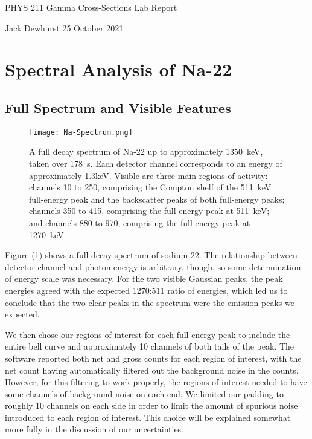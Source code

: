 \documentclass[letter]{article}
\begin{document}

\begin{center}
	{\large PHYS 211 Gamma Cross-Sections Lab Report}
	
	Jack Dewhurst \hspace{1cm}
	25 October 2021
	
	\vspace{5mm}
\end{center}
	


\section{Spectral Analysis of Na-22}

\subsection{Full Spectrum and Visible Features}
\begin{figure}[h] \centering
    \texttt{[image: Na-Spectrum.png]}
    \caption{A full decay spectrum of Na-22 up to approximately \qty{1350}{\kilo\electronvolt}, taken over \qty{178}{\second}. Each detector channel corresponds to an energy of approximately 1.3keV. Visible are three main regions of activity: channels 10 to 250, comprising the Compton shelf of the \qty{511}{\kilo\electronvolt} full-energy peak and the backscatter peaks of both full-energy peaks; channels 350 to 415, comprising the full-energy peak at \qty{511}{\kilo\electronvolt}; and channels 880 to 970, comprising the full-energy peak at \qty{1270}{\kilo\electronvolt}.}
    \label{fig:NaFullSpec}
\end{figure}

Figure (\ref{fig:NaFullSpec}) shows a full decay spectrum of sodium-22. The relationship between detector channel and photon energy is arbitrary, though, so some determination of energy scale was necessary. For the two visible Gaussian peaks, the peak energies agreed with the expected 1270:511 ratio of energies, which led us to conclude that the two clear peaks in the spectrum were the emission peaks we expected.

We then chose our regions of interest for each full-energy peak to include the entire bell curve and approximately 10 channels of both tails of the peak. The software reported both net and gross counts for each region of interest, with the net count having automatically filtered out the background noise in the counts. However, for this filtering to work properly, the regions of interest needed to have some channels of background noise on each end. We limited our padding to roughly 10 channels on each side in order to limit the amount of spurious noise introduced to each region of interest. This choice will be explained somewhat more fully in the discussion of our uncertainties.
\end{document}
